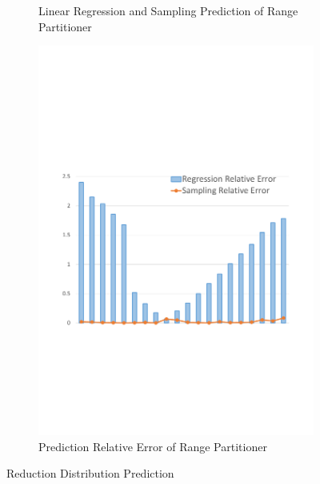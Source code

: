 \documentclass[10pt,twocolumn]{article}
\begin{document}
\begin{figure}
\begin{subfigure}[b]{0.32\linewidth}
		\caption{Linear Regression and Sampling Prediction of Range Partitioner}
		\label{fig:range_pre_sample}
	\end{subfigure}
	\begin{subfigure}[b]{0.32\linewidth}
		\includegraphics[width=\linewidth]{fig/prediction_relative_error}
		\caption{Prediction Relative Error of Range Partitioner}
		\label{fig:prediction_relative_error}
	\end{subfigure}
	\caption{Reduction Distribution Prediction}
	\label{fig:dis}
\end{figure}
\end{document}
